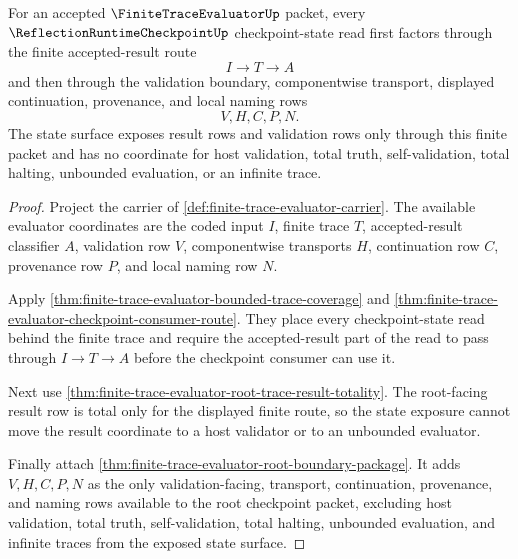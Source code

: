\begin{theorem}
\label{thm:finite-trace-evaluator-checkpoint-state-exposure}
For an accepted $\FiniteTraceEvaluatorUp$ packet, every
$\ReflectionRuntimeCheckpointUp$ checkpoint-state read first factors through
the finite accepted-result route
$$
I \to T \to A
$$
and then through the validation boundary, componentwise transport, displayed
continuation, provenance, and local naming rows
$$
V,H,C,P,N.
$$
The state surface exposes result rows and validation rows only through this
finite packet and has no coordinate for host validation, total truth,
self-validation, total halting, unbounded evaluation, or an infinite trace.
\end{theorem}
\begin{proof}
Project the carrier of \autoref{def:finite-trace-evaluator-carrier}. The
available evaluator coordinates are the coded input $I$, finite trace $T$,
accepted-result classifier $A$, validation row $V$, componentwise transports
$H$, continuation row $C$, provenance row $P$, and local naming row $N$.

Apply \autoref{thm:finite-trace-evaluator-bounded-trace-coverage} and
\autoref{thm:finite-trace-evaluator-checkpoint-consumer-route}. They place
every checkpoint-state read behind the finite trace and require the
accepted-result part of the read to pass through $I \to T \to A$ before the
checkpoint consumer can use it.

Next use \autoref{thm:finite-trace-evaluator-root-trace-result-totality}. The
root-facing result row is total only for the displayed finite route, so the
state exposure cannot move the result coordinate to a host validator or to an
unbounded evaluator.

Finally attach \autoref{thm:finite-trace-evaluator-root-boundary-package}. It
adds $V,H,C,P,N$ as the only validation-facing, transport, continuation,
provenance, and naming rows available to the root checkpoint packet, excluding
host validation, total truth, self-validation, total halting, unbounded
evaluation, and infinite traces from the exposed state surface.
\end{proof}

